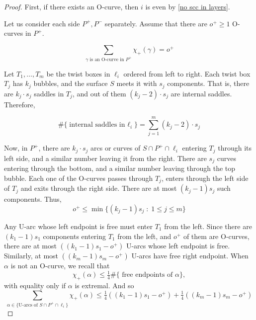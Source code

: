 \documentclass[12pt,reqno]{amsart}
\theoremstyle{plain}
\theoremstyle{definition}
\begin{document}
\begin{proof}
First, if there exists an O-curve, then $i$ is even by  
\ref{no scc in layers}.


Let us consider each side $P^+,P^-$ separately. Assume that there are 
$o^+\ge 1$ O-curves in $P^+$. 

\begin{equation}\label{contribution of O-curves}
\sum_{\gamma\text{ is an O-curve in }P^+}\chi_+(\gamma) = o^+
\end{equation}

Let $T_1,\dots,T_m$ be the twist boxes in $\ell_i$ ordered from left to right. 
Each twist box $T_j$ has $k_j$ bubbles, and the surface $S$ meets it with $s_j$ 
components. That is, there are $k_j\cdot s_j$ saddles in $T_j$, and out of 
them $(k_j-2)\cdot s_j$ are internal saddles. Therefore,

\begin{equation}\label{number of internal bubbles} 
\#\{\text{internal saddles in $\ell_i$}\} = \sum_{j=1}^m (k_j-2)\cdot s_j
\end{equation}

Now, in $P^+$, there are $k_j\cdot s_j$ arcs or curves of $S\cap P^+ \cap \ell_i$ 
entering $T_j$ through its left side, and a similar number leaving it from the right. 
There are $s_j$ curves entering through the bottom, and a similar number leaving 
through the top bubble. Each one of the O-curves passes through $T_j$, enters through 
the left side of $T_j$ and exits through the right side. There are at most 
$(k_j -1)s_j$ such components. Thus,
\begin{equation}\label{O-curves bound}
    o^+ \le \min\{(k_j -1)s_j \;:\;1\le j \le m\}
\end{equation}
    
Any U-arc whose left endpoint is free must enter $T_1$ from the left. Since there 
are $(k_1-1)s_1$ components entering $T_1$ from the left, and $o^+$ of them are O-curves, 
there are at most $((k_1-1)s_1 - o^+)$ U-arcs whose left endpoint is free. Similarly, 
at most $((k_m-1)s_m - o^+)$ U-arcs have free right endpoint. When 
$\alpha$ is not an O-curve, we recall that 
\[ \chi_+(\alpha) \leq \tfrac14\#\{\text{ free endpoints of }\alpha\}, \]
with equality only if $\alpha$ is extremal.
And so
\begin{equation}\label{free endpoints}
\sum_{\alpha\in \{\text{U-arcs of }S\cap P^+\cap \ell_i\}} \chi_+(\alpha) \le 
\tfrac14((k_1-1)s_1 - o^+) + \tfrac14((k_m-1)s_m - o^+)
\end{equation}


\end{proof}
\end{document}
